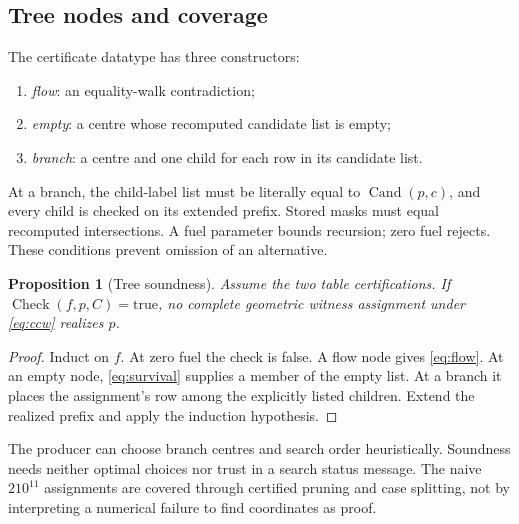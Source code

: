 \documentclass[11pt,a4paper]{article}
\newtheorem{proposition}[theorem]{Proposition}
\theoremstyle{definition}
\newcommand{\CertCheck}{\operatorname{Check}}
\newcommand{\Cand}{\operatorname{Cand}}
\begin{document}
\subsection{Tree nodes and coverage}
The certificate datatype has three constructors:
\begin{enumerate}[label=(\roman*)]
\item \emph{flow}: an equality-walk contradiction;
\item \emph{empty}: a centre whose recomputed candidate list is empty;
\item \emph{branch}: a centre and one child for each row in its candidate list.
\end{enumerate}
At a branch, the child-label list must be literally equal to $\Cand(p,c)$, and every child is checked on its extended prefix. Stored masks must equal recomputed intersections. A fuel parameter bounds recursion; zero fuel rejects. These conditions prevent omission of an alternative.

\begin{proposition}[Tree soundness]\label{prop:sound}
Assume the two table certifications. If $\CertCheck(f,p,C)=\mathrm{true}$, no complete geometric witness assignment under \eqref{eq:ccw} realizes $p$.
\end{proposition}
\begin{proof}
Induct on $f$. At zero fuel the check is false. A flow node gives \eqref{eq:flow}. At an empty node, \eqref{eq:survival} supplies a member of the empty list. At a branch it places the assignment's row among the explicitly listed children. Extend the realized prefix and apply the induction hypothesis.
\end{proof}
The producer can choose branch centres and search order heuristically. Soundness needs neither optimal choices nor trust in a search status message. The naive $210^{11}$ assignments are covered through certified pruning and case splitting, not by interpreting a numerical failure to find coordinates as proof.
\end{document}
